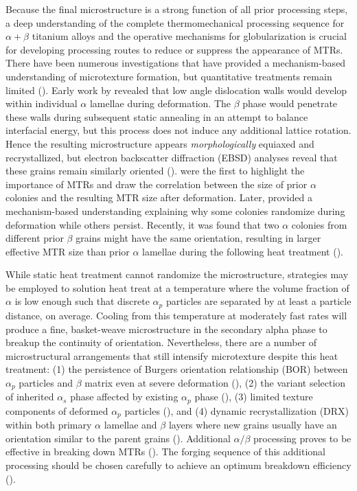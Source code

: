 \documentclass[review]{elsarticle}
\begin{document}
Because the final microstructure is a strong function of all prior processing steps, a deep understanding of the complete thermomechanical processing sequence for $\alpha + \beta$ titanium alloys and the operative mechanisms for globularization is crucial for developing processing routes to reduce or suppress the appearance of MTRs.
There have been numerous investigations that have provided a mechanism-based understanding of microtexture formation, but quantitative treatments remain limited (\cite{Venkatesh2016}).
Early work by \cite{Weiss1986} revealed that low angle dislocation walls would develop within individual $\alpha$ lamellae during deformation.
The $\beta$ phase would penetrate these walls during subsequent static annealing in an attempt to balance interfacial energy, but this process does not induce any additional lattice rotation.
Hence the resulting microstructure appears \textit{morphologically} equiaxed and recrystallized, but electron backscatter diffraction (EBSD) analyses reveal that these grains remain similarly oriented (\cite{r9,r10,r11,r12}).
\cite{r6} were the first to highlight the importance of MTRs and draw the correlation between the size of prior $\alpha$ colonies and the resulting MTR size after deformation.
Later, \cite{r13} provided a mechanism-based understanding explaining why some colonies randomize during deformation while others persist.
Recently, it was found that two $\alpha$ colonies from different prior $\beta$ grains might have the same orientation, resulting in larger effective MTR size than prior $\alpha$ lamellae during the following heat treatment (\cite{r9}).

While static heat treatment cannot randomize the microstructure, strategies may be employed to solution heat treat at a temperature where the volume fraction of $\alpha$ is low enough such that discrete $\alpha _p$ particles are separated by at least a particle distance, on average.
Cooling from this temperature at moderately fast rates will produce a fine, basket-weave microstructure in the secondary alpha phase to breakup the continuity of orientation.
Nevertheless, there are a number of microstructural arrangements that still intensify microtexture despite this heat treatment:
(1) the persistence of Burgers orientation relationship (BOR) between $\alpha _p$ particles and $\beta$ matrix even at severe deformation (\cite{r9,r10,r11}),
(2) the variant selection of inherited $\alpha _s$ phase affected by existing $\alpha _p$ phase (\cite{r9,r11,r12}),
(3) limited texture components of deformed $\alpha _p$ particles (\cite{r9}), and
(4) dynamic recrystallization (DRX) within both primary $\alpha$ lamellae and $\beta$ layers where new grains usually have an orientation similar to the parent grains (\cite{r11,r13}).
Additional $\alpha/\beta$ processing proves to be effective in breaking down MTRs (\cite{r14}).
The forging sequence of this additional processing should be chosen carefully to achieve an optimum breakdown efficiency (\cite{r13}).
\end{document}
